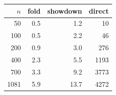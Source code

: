 \begin{tabular}{rrrr}
\toprule
$n$ & fold & showdown & direct \\ \midrule
50 & 0.5 & 1.2 & 10 \\
100 & 0.5 & 2.2 & 46 \\
200 & 0.9 & 3.0 & 276 \\
400 & 2.3 & 5.5 & 1193 \\
700 & 3.3 & 9.2 & 3773 \\
1081 & 5.9 & 13.7 & 4272 \\
\bottomrule
\end{tabular}
